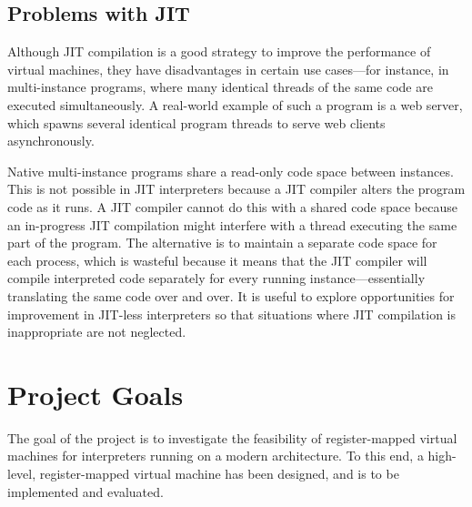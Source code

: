 \documentclass[A4]{sig-alternate}
\begin{document}
\subsection{Problems with JIT}
Although JIT compilation is a good strategy to improve the performance of virtual machines, they have disadvantages in certain use cases---for instance, in multi-instance programs, where many identical threads of the same code are executed simultaneously. A real-world example of such a program is a web server, which spawns several identical program threads to serve web clients asynchronously.

Native multi-instance programs share a read-only code space between instances. This is not possible in JIT interpreters because a JIT compiler alters the program code as it runs. A JIT compiler cannot do this with a shared code space because an in-progress JIT compilation might interfere with a thread executing the same part of the program. The alternative is to maintain a separate code space for each process, which is wasteful because it means that the JIT compiler will compile interpreted code separately for every running instance---essentially translating the same code over and over. It is useful to explore opportunities for improvement in JIT-less interpreters so that situations where JIT compilation is inappropriate are not neglected.





\section{Project Goals} 
The goal of the project is to investigate the feasibility of register-mapped virtual machines for interpreters running on a modern architecture. To this end, a high-level, register-mapped virtual machine has been designed, and is to be implemented and evaluated.
\end{document}
